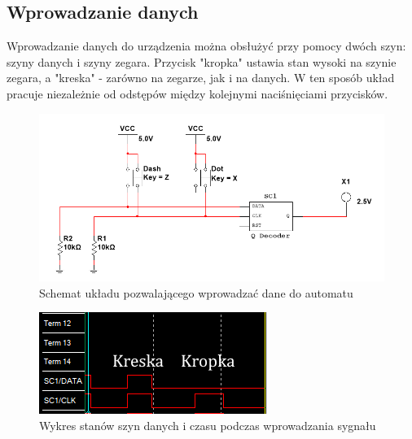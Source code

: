 \documentclass[12pt,a4paper,table]{article}
\begin{document}
    \subsection{Wprowadzanie danych}
    Wprowadzanie danych do urządzenia można obsłużyć przy pomocy dwóch
    szyn: szyny danych i szyny zegara. Przycisk "kropka" ustawia stan wysoki
    na szynie zegara, a "kreska" - zarówno na zegarze, jak i na danych.
    W ten sposób układ pracuje niezależnie od odstępów między kolejnymi naciśnięciami
    przycisków.

    \begin{figure}[h]
        \centering
        \includegraphics[width=\linewidth]{images/q_input.PNG}
        \caption{Schemat układu pozwalającego wprowadzać dane do automatu}
        \label{fig:q_input}
    \end{figure}


    \begin{figure}[h]
        \centering
        \includegraphics[width=0.3\linewidth]{images/q_input_plot.PNG}
        \caption{Wykres stanów szyn danych i czasu podczas wprowadzania
        sygnału}
        \label{fig:q_idea_plot}
    \end{figure}
\end{document}
